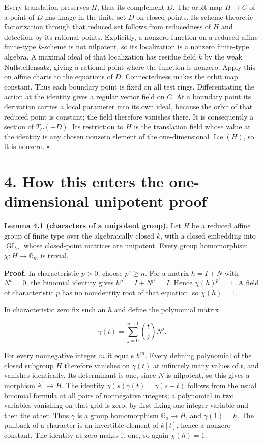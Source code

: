 \documentclass[11pt,a4paper,openany]{report}
\begin{document}
Every translation preserves \(H\), thus its complement \(D\). The orbit map \(H\to C\) of a point of \(D\) has image in the finite set \(D\) on closed points. Its scheme-theoretic factorization through that reduced set follows from reducedness of \(H\) and detection by its rational points. Explicitly, a nonzero function on a reduced affine finite-type \(k\)-scheme is not nilpotent, so its localization is a nonzero finite-type algebra. A maximal ideal of that localization has residue field \(k\) by the weak Nullstellensatz, giving a rational point where the function is nonzero. Apply this on affine charts to the equations of \(D\). Connectedness makes the orbit map constant. Thus each boundary point is fixed on all test rings. Differentiating the action at the identity gives a regular vector field on \(C\). At a boundary point its derivation carries a local parameter into its own ideal, because the orbit of that reduced point is constant; the field therefore vanishes there. It is consequently a section of \(T_C(-D)\). Its restriction to \(H\) is the translation field whose value at the identity is any chosen nonzero element of the one-dimensional \(\operatorname{Lie}(H)\), so it is nonzero. \(\square\)

\section{4. How this enters the one-dimensional unipotent proof}\label{AG-RG-S03-how-this-enters-the-one-dimensional-unipotent-proof}

\textbf{Lemma 4.1 (characters of a unipotent group).} Let \(H\) be a reduced affine group of finite type over the algebraically closed \(k\), with a closed embedding into \(\operatorname{GL}_n\) whose closed-point matrices are unipotent. Every group homomorphism \(\chi:H\to\mathbb G_m\) is trivial.

\textbf{Proof.} In characteristic \(p>0\), choose \(p^e\ge n\). For a matrix \(h=I+N\) with \(N^n=0\), the binomial identity gives \(h^{p^e}=I+N^{p^e}=I\). Hence \(\chi(h)^{p^e}=1\). A field of characteristic \(p\) has no nonidentity root of that equation, so \(\chi(h)=1\).

In characteristic zero fix such an \(h\) and define the polynomial matrix

\[
\gamma(t)=\sum_{j=0}^{n-1}\binom tj N^j.
\]

For every nonnegative integer \(m\) it equals \(h^m\). Every defining polynomial of the closed subgroup \(H\) therefore vanishes on \(\gamma(t)\) at infinitely many values of \(t\), and vanishes identically. Its determinant is one, since \(N\) is nilpotent, so this gives a morphism \(\mathbb A^1\to H\). The identity \(\gamma(s)\gamma(t)=\gamma(s+t)\) follows from the usual binomial formula at all pairs of nonnegative integers; a polynomial in two variables vanishing on that grid is zero, by first fixing one integer variable and then the other. Thus \(\gamma\) is a group homomorphism \(\mathbb G_a\to H\), and \(\gamma(1)=h\). The pullback of a character is an invertible element of \(k[t]\), hence a nonzero constant. The identity at zero makes it one, so again \(\chi(h)=1\).
\end{document}
